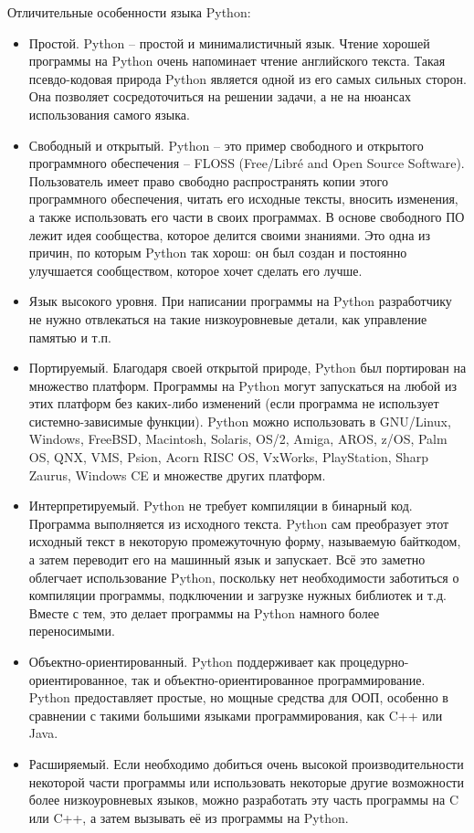 Отличительные особенности языка Python:
\begin{itemize}
  \item Простой. Python -- простой и минималистичный язык. Чтение хорошей программы на Python очень напоминает чтение английского текста. Такая псевдо-кодовая природа Python является одной из его самых сильных сторон. Она позволяет сосредоточиться на решении задачи, а не на нюансах использования самого языка.
  \item Свободный и открытый. Python – это пример свободного и открытого программного обеспечения – FLOSS (Free/Libré and Open Source Software). Пользователь имеет право свободно распространять копии этого программного обеспечения, читать его исходные тексты, вносить изменения, а также использовать его части в своих программах. В основе свободного ПО лежит идея сообщества, которое делится своими знаниями. Это одна из причин, по которым Python так хорош: он был создан и постоянно улучшается сообществом, которое хочет сделать его лучше.
  \item Язык высокого уровня. При написании программы на Python разработчику не нужно отвлекаться на такие низкоуровневые детали, как управление памятью и т.п.
  \item Портируемый. Благодаря своей открытой природе, Python был портирован на множество платформ. Программы на Python могут запускаться на любой из этих платформ без каких-либо изменений (если программа не использует системно-зависимые функции). Python можно использовать в GNU/Linux, Windows, FreeBSD, Macintosh, Solaris, OS/2, Amiga, AROS, z/OS, Palm OS, QNX, VMS, Psion, Acorn RISC OS, VxWorks, PlayStation, Sharp Zaurus, Windows CE и множестве других платформ.
  \item Интерпретируемый. Python не требует компиляции в бинарный код. Программа выполняется из исходного текста. Python сам преобразует этот исходный текст в некоторую промежуточную форму, называемую байткодом, а затем переводит его на машинный язык и запускает. Всё это заметно облегчает использование Python, поскольку нет необходимости заботиться о компиляции программы, подключении и загрузке нужных библиотек и т.д. Вместе с тем, это делает программы на Python намного более переносимыми.
  \item Объектно-ориентированный. Python поддерживает как процедурно-ориентированное, так и объектно-ориентированное программирование. Python предоставляет простые, но мощные средства для ООП, особенно в сравнении с такими большими языками программирования, как C++ или Java.
  \item Расширяемый. Если необходимо добиться очень высокой производительности некоторой части программы или использовать некоторые другие возможности более низкоуровневых языков, можно разработать эту часть программы на C или C++, а затем вызывать её из программы на Python.

\end{itemize}
